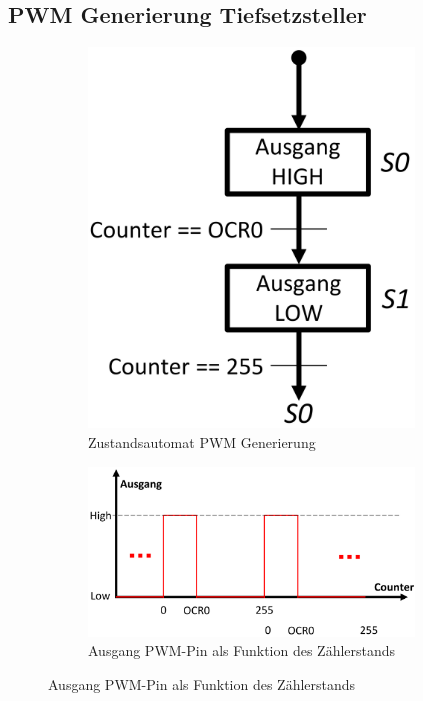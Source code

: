 \documentclass[a4paper, 11pt]{report}
\begin{document}
\subsection{PWM Generierung Tiefsetzsteller}
\begin{figure}[th]
	\centering
	\begin{subfigure}{0.34\textwidth}
		\centering
		\includegraphics[width=0.95\textwidth]{rec/zustandsautomatPWM.png}
		\caption{Zustandsautomat PWM Generierung}

	\end{subfigure}
	\begin{subfigure}{0.64\textwidth}
		\centering
		\includegraphics[width=0.95\textwidth]{rec/graphPWM.png}
		\caption{Ausgang PWM-Pin als Funktion des Zählerstands}

	\end{subfigure}
	\label{fig:PWMGEN}

\end{figure}
\end{document}
